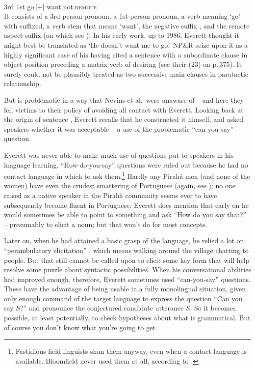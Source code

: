 \documentclass[output=paper,colorlinks,citecolor=brown
]{langscibook}
\begin{document}
\ea\label{ex:pullum:3}
\gll {}    
            \\
         3rd 1st go\,[+] want.not.\textsc{remote}\\
\z
\noindent
It consists of a 3rd-person pronoun, a 1st-person pronoun, a
verb meaning `go' with \mbox{} suffixed, a verb stem that
means `want', the negative suffix , and the remote aspect
suffix  (on which see \citealt[293--294]{Everett86HAL}). In
his early work, up to 1986, Everett thought it might best be translated
as `He doesn't want me to go.' NP\&R seize upon it as a highly significant
case of his having cited a sentence with a subordinate clause in
object position preceding a matrix verb of desiring (see their (23)
on p.\,375). It surely could not be plausibly treated as two successive
main clauses in paratactic relationship.

But  is problematic in a way that Nevins et al.\ were
unaware of -- and here they fell victims to their policy of avoiding
all contact with Everett. Looking back at the origin of sentence
, Everett recalls that he constructed it himself,
and asked speakers whether it was acceptable -- a use of the
problematic ``can-you-say'' question.

Everett was never able to make much use of questions put to speakers
in his language learning.  ``How-do-you-say'' questions
\parencites[114, Ch.~6]{Samarin67}[{\textsection}6.4]{SakeEver12} were ruled out because he had no contact language in
which to ask them.\footnote{\label{voegelin}%
   Fastidious field linguists shun them anyway, even when a contact language
   is available. Bloomfield never used them at all, according to
   \citet[204]{Voegelin60}.}
Hardly any Pirah{\~a} men (and none of the women) have even the crudest
smattering of Portuguese (again, see \citealt{Sakel12}); no one raised
as a native speaker in the Pirah{\~a} community seems ever to have
subsequently become fluent in Portuguese. Everett does mention that
early on he would sometimes be able to point to something and ask
``How do you say that?'' \citep[20]{Everett08} -- presumably
to elicit a noun; but that won't do for most concepts.

Later on, when he had attained a basic grasp of the language, he relied
a lot on ``perambulatory elicitation'' \citep[200]{Everett86HAL}, which
means walking around the village chatting to people. But that still
cannot be called upon to elicit some key form that will help resolve
some puzzle about syntactic possibilities. When his conversational
abilities had improved enough, therefore, Everett sometimes used
``can-you-say'' questions. These have the advantage of being usable in
a fully monolingual situation, given only enough command of the target
language to express the question ``Can you say $S$?'' and pronounce the
conjectured candidate utterance $S$. So it becomes possible, at least
potentially, to check hypotheses about what is grammatical. But of
course you don't know what you're going to get.
\end{document}
